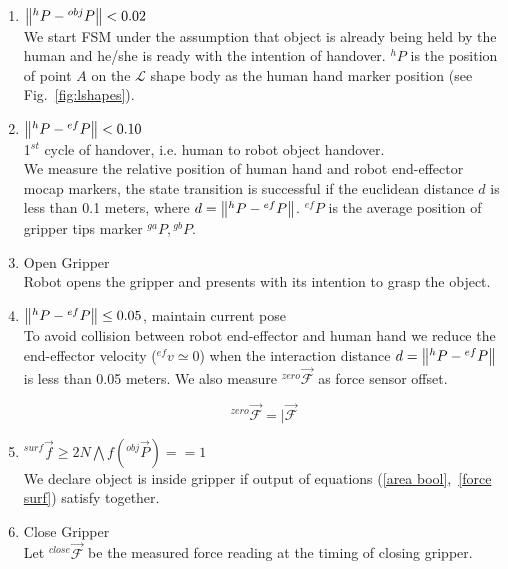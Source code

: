\documentclass[a4paper, 12pt, oneside]{Thesis}  %
\begin{document}
\begin{enumerate}[start=0,label={\bf{t}\arabic*:}]
    \item $\norm{{}^h{P} - {}^{obj}{P}} < 0.02$\\
    We start FSM under the assumption that object is already being held by the human and he/she is ready with the intention of handover. ${}^h{P}$ is the position of point $A$ on the $\mathcal{L}$ shape body as the human hand marker position (see Fig.~\ref{fig:lshapes}).
    
    
    \item $\norm{{}^h{P} - {}^{ef}{P}} < 0.10$\\
    1$^{st}$ cycle of handover, i.e. human to robot object handover.\\
    We measure the relative position of human hand and robot end-effector mocap markers, the state transition is successful if the euclidean distance $d$ is less than 0.1 meters, where $d = \norm{{}^h{P} - {}^{ef}{P}}$. ${}^{ef}{P}$ is the average position of gripper tips marker ${}^{ga}P, {}^{gb}P$. 
    
    \item Open Gripper\\
    Robot opens the gripper and presents with its intention to grasp the object.
    
    \item $\norm{{}^h{P} - {}^{ef}{P}} \leq 0.05$, maintain current pose\\
    To avoid collision between robot end-effector and human hand we reduce the end-effector velocity (${}^{ef}v\simeq0$) when the interaction distance $d = \norm{{}^h{P} - {}^{ef}{P}}$ is less than 0.05 meters. We also measure ${}^{zero}\vec{\mathcal{F}}$ as force sensor offset.

    \begin{equation}\label{Fzero}
        {}^{zero}\vec{\mathcal{F}} = \vert{\vec{\mathcal{F}}}
    \end{equation}

    \item ${}^{surf}\vec{f} \geq 2N \bigwedge { }{ } f({}^{obj}\vec{P})  == 1$\\
    We declare object is inside gripper if output of equations (\ref{area bool},~\ref{force surf}) satisfy together.
    
    \item Close Gripper\\
    Let ${}^{close}\vec{\mathcal{F}}$ be the measured force reading at the timing of closing gripper.
        

\end{enumerate}
\end{document}
